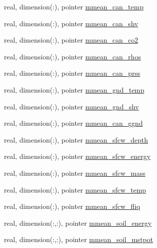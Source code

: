 \begin{DoxyCompactItemize}
\item 
real, dimension(\+:), pointer \hyperlink{structed__state__vars_1_1edtype_aebc0e806446264e6be0a065098c16267}{mmean\+\_\+can\+\_\+temp}
\item 
real, dimension(\+:), pointer \hyperlink{structed__state__vars_1_1edtype_ab3246680235c331c43d87a2b2512513f}{mmean\+\_\+can\+\_\+shv}
\item 
real, dimension(\+:), pointer \hyperlink{structed__state__vars_1_1edtype_ad51f46958f128e3f04a1427b24ac647c}{mmean\+\_\+can\+\_\+co2}
\item 
real, dimension(\+:), pointer \hyperlink{structed__state__vars_1_1edtype_a12d25113ef54aca865b16185be7a1316}{mmean\+\_\+can\+\_\+rhos}
\item 
real, dimension(\+:), pointer \hyperlink{structed__state__vars_1_1edtype_a4e01479c65ce244fb7f1bc7de800f67b}{mmean\+\_\+can\+\_\+prss}
\item 
real, dimension(\+:), pointer \hyperlink{structed__state__vars_1_1edtype_a3b4d974d4795356ccf6b8b468e8ca971}{mmean\+\_\+gnd\+\_\+temp}
\item 
real, dimension(\+:), pointer \hyperlink{structed__state__vars_1_1edtype_a10dd5518d29d2494d798c813ae764316}{mmean\+\_\+gnd\+\_\+shv}
\item 
real, dimension(\+:), pointer \hyperlink{structed__state__vars_1_1edtype_ac1e745c93af5100dfb5d54c831a88dbe}{mmean\+\_\+can\+\_\+ggnd}
\item 
real, dimension(\+:), pointer \hyperlink{structed__state__vars_1_1edtype_af711abd5949a80e5b3cbf62e8f121a90}{mmean\+\_\+sfcw\+\_\+depth}
\item 
real, dimension(\+:), pointer \hyperlink{structed__state__vars_1_1edtype_a6d75234404f4acf7e377d811cc2a9593}{mmean\+\_\+sfcw\+\_\+energy}
\item 
real, dimension(\+:), pointer \hyperlink{structed__state__vars_1_1edtype_a2d83f50738ade147052a633bee824540}{mmean\+\_\+sfcw\+\_\+mass}
\item 
real, dimension(\+:), pointer \hyperlink{structed__state__vars_1_1edtype_ab8b7d7a3049c74a5094c1d24fcc1b9a2}{mmean\+\_\+sfcw\+\_\+temp}
\item 
real, dimension(\+:), pointer \hyperlink{structed__state__vars_1_1edtype_affa7aaff15af90103d7e347573b77e02}{mmean\+\_\+sfcw\+\_\+fliq}
\item 
real, dimension(\+:,\+:), pointer \hyperlink{structed__state__vars_1_1edtype_a00bb73c70a541884822b9decfa06d2bb}{mmean\+\_\+soil\+\_\+energy}
\item 
real, dimension(\+:,\+:), pointer \hyperlink{structed__state__vars_1_1edtype_aa651b35f05fd592f9e9bda7d8ef0a6bd}{mmean\+\_\+soil\+\_\+mstpot}

\end{DoxyCompactItemize}
